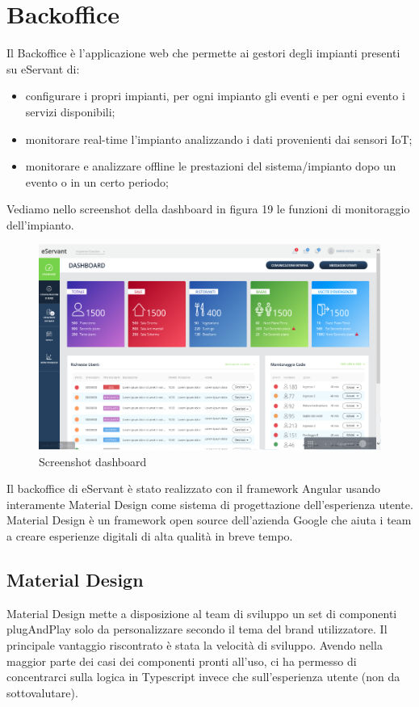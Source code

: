 \chapter{Backoffice}
Il Backoffice è l'applicazione web che permette ai gestori degli impianti presenti su eServant di:
\begin{itemize}
    \item configurare i propri impianti, per ogni impianto gli eventi e per ogni evento i servizi disponibili;
    \item monitorare real-time l'impianto analizzando i dati provenienti dai sensori IoT;
    \item monitorare e analizzare offline le prestazioni del sistema/impianto dopo un evento o in un certo periodo;
\end{itemize}
Vediamo nello screenshot della dashboard in figura 19 le funzioni di monitoraggio dell'impianto.
\begin{figure}[H]
    \centering  
    \caption{Screenshot dashboard}
    \includegraphics[scale=0.4]{img/cap3/backoffice}
\end{figure}

Il backoffice di eServant è stato realizzato con il framework Angular usando interamente Material Design come
sistema di progettazione dell'esperienza utente.
Material Design è un framework open source dell'azienda Google che aiuta i team a creare esperienze digitali
di alta qualità in breve tempo.

\section{Material Design}
Material Design mette a disposizione al team di sviluppo un set di componenti plugAndPlay solo da personalizzare
secondo il tema del brand utilizzatore.
Il principale vantaggio riscontrato è stata la velocità di sviluppo. Avendo nella maggior parte dei
casi dei componenti pronti all'uso, ci ha permesso di concentrarci sulla logica in Typescript invece che
sull'esperienza utente (non da sottovalutare).\\

